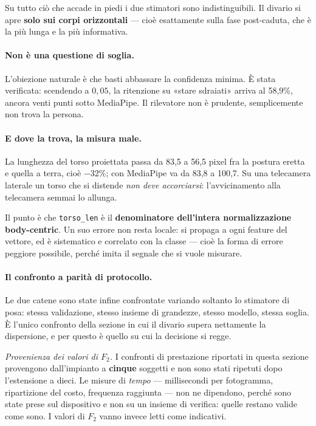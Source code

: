 Su tutto ciò che accade in piedi i due stimatori sono indistinguibili. Il divario si apre \textbf{solo sui corpi orizzontali} --- cioè esattamente sulla fase post-caduta, che è la più lunga e la più informativa.

\paragraph{Non è una questione di soglia.} L'obiezione naturale è che basti abbassare la confidenza minima. È stata verificata: scendendo a $0{,}05$, la ritenzione su «stare sdraiati» arriva al 58,9\%, ancora venti punti sotto MediaPipe. Il rilevatore non è prudente, semplicemente non trova la persona.

\paragraph{E dove la trova, la misura male.} La lunghezza del torso proiettata passa da 83,5 a 56,5 pixel fra la postura eretta e quella a terra, cioè $-32\%$; con MediaPipe va da 83,8 a 100,7. Su una telecamera laterale un torso che si distende \emph{non deve accorciarsi}: l'avvicinamento alla telecamera semmai lo allunga.

Il punto è che \texttt{torso\_len} è il \textbf{denominatore dell'intera normalizzazione body-centric}. Un suo errore non resta locale: si propaga a ogni feature del vettore, ed è sistematico e correlato con la classe --- cioè la forma di errore peggiore possibile, perché imita il segnale che si vuole misurare.

\paragraph{Il confronto a parità di protocollo.} Le due catene sono state infine confrontate variando soltanto lo stimatore di posa: stessa validazione, stesso insieme di grandezze, stesso modello, stessa soglia. È l'unico confronto della sezione in cui il divario supera nettamente la dispersione, e per questo è quello su cui la decisione si regge.

\emph{Provenienza dei valori di $F_2$.} I confronti di prestazione riportati in questa sezione provengono dall'impianto a \textbf{cinque} soggetti e non sono stati ripetuti dopo l'estensione a dieci. Le misure di \emph{tempo} --- millisecondi per fotogramma, ripartizione del costo, frequenza raggiunta --- non ne dipendono, perché sono state prese sul dispositivo e non su un insieme di verifica: quelle restano valide come sono. I valori di $F_2$ vanno invece letti come indicativi.

